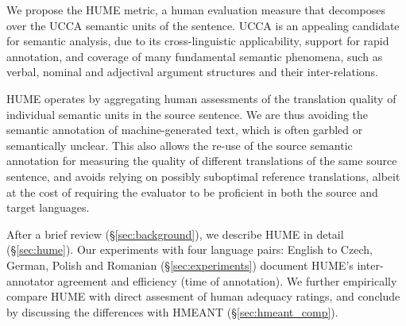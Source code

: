 \documentclass[11pt,letterpaper]{article}
\newcommand{\secref}[1]{\S\ref{#1}}
\newcommand{\XXX}[1]{{\color{red}XXX #1}} %
\newcommand{\bh}[1]{}
\def\parcite#1{\cite{#1}}
\begin{document}

We propose the HUME metric,
a human evaluation measure that decomposes over the UCCA semantic units of the sentence.
UCCA \parcite{abend2013universal} is an appealing candidate for semantic analysis,
due to its cross-linguistic applicability, support for rapid annotation, and coverage
of many fundamental semantic phenomena, such as verbal, nominal and adjectival
argument structures and their inter-relations.

HUME operates by aggregating human assessments of the translation quality of individual
semantic units in the source sentence. We 
are thus avoiding the semantic annotation of machine-generated text,
which is often garbled or semantically unclear.
This also allows the re-use of the source semantic annotation for
measuring the quality of different translations of the same source sentence,
and 
avoids relying on possibly suboptimal reference translations,
albeit at the cost of requiring the
evaluator to be proficient in both the source and target languages.

After a brief review (\secref{sec:background}), we describe HUME in detail
(\secref{sec:hume}).
Our experiments with four language pairs: English to Czech, German, Polish and Romanian (\secref{sec:experiments})
document HUME's inter-annotator agreement and efficiency (time of annotation). 
We further empirically compare HUME with direct assesment of human adequacy ratings,
and conclude by discussing the differences with HMEANT (\secref{sec:hmeant_comp}).

% 
\end{document}
